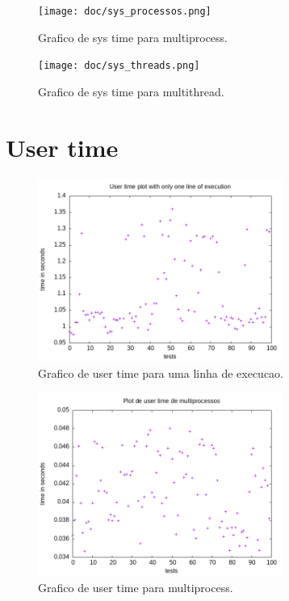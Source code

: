 \documentclass[12pt]{article}
\begin{document}
    \begin{figure}[H]
        \caption{Grafico de sys time para multiprocess.}
        \centering
        \texttt{[image: doc/sys\_processos.png]}
    \end{figure}

    \begin{figure}[H]
        \caption{Grafico de sys time para multithread.}
        \centering
        \texttt{[image: doc/sys\_threads.png]}
    \end{figure}

\section{User time}
    \begin{figure}[H]
        \caption{Grafico de user time para uma linha de execucao.}
        \centering
        \includegraphics[width=8cm]{doc/user_simples.png}
    \end{figure}

    \begin{figure}[H]
        \caption{Grafico de user time para multiprocess.}
        \centering
        \includegraphics[width=8cm]{doc/user_processos.png}
    \end{figure}
\end{document}
